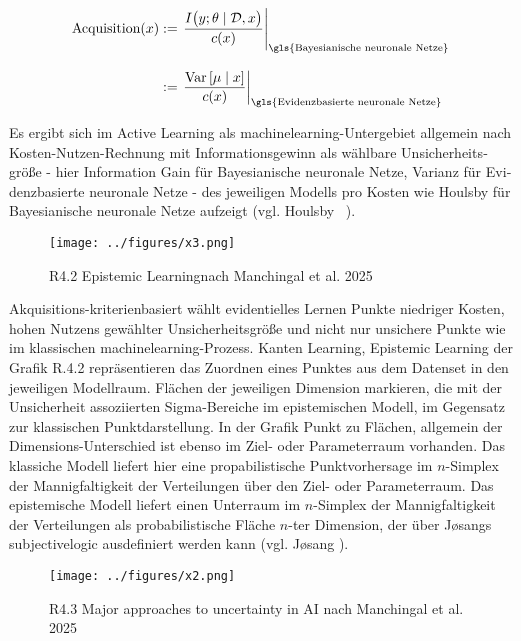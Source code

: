 \begin{otherlanguage}{ngerman}
\begin{align*}
\text{Acquisition}(x)
&:=
\left.
\frac{
I\bigl(y ; \theta \mid \mathcal{D}, x \bigr)
}{
c(x)
}
\right|_{\text{\gls{Bayesianische neuronale Netze}}}
\\[2ex]
&:=
\left.
\frac{
\mathrm{Var}\left[ \mu \mid x \right]
}{
c(x)
}
\right|_{\text{\gls{Evidenzbasierte neuronale Netze}}}
\end{align*}

Es ergibt sich im Active Learning als \gls{machinelearning}-Untergebiet allgemein nach Kosten-Nutzen-Rechnung mit Informationsgewinn als wählbare Unsicherheitsgröße - hier Information Gain für \gls{Bayesianische neuronale Netze}, Varianz für \gls{Evidenzbasierte neuronale Netze} - des jeweiligen Modells pro Kosten wie Houlsby für \gls{Bayesianische neuronale Netze} aufzeigt (vgl. Houlsby ~\parencite[S.9 \glqq{}Bayesian active learning by disagreement (BALD)\grqq{}]{houlsby2011bayesian}). 

\begin{figure}[!ht]
  \centering
  \texttt{[image: ../figures/x3.png]}
  \caption{R4.2 \glqq Epistemic Learning\grqq nach Manchingal et al. 2025}
\end{figure}

Akquisitions-kriterienbasiert wählt evidentielles Lernen Punkte niedriger Kosten, hohen Nutzens gewählter Unsicherheitsgröße und nicht nur unsichere Punkte wie im klassischen \gls{machinelearning}-Prozess. Kanten \glqq{}Learning\grqq{}, \glqq{}Epistemic Learning\grqq{} der Grafik R.4.2 repräsentieren das Zuordnen eines Punktes aus dem Datenset in den jeweiligen Modellraum. Flächen der jeweiligen Dimension markieren, die mit der Unsicherheit assoziierten Sigma-Bereiche im epistemischen Modell, im Gegensatz zur klassischen Punktdarstellung. In der Grafik Punkt zu Flächen, allgemein der Dimensions-Unterschied ist ebenso im Ziel- oder Parameterraum vorhanden. Das klassiche Modell liefert hier eine propabilistische Punktvorhersage im $n$-Simplex der Mannigfaltigkeit der Verteilungen über den Ziel- oder Parameterraum. Das epistemische Modell liefert einen Unterraum im $n$-Simplex der Mannigfaltigkeit der Verteilungen als probabilistische Fläche $n$-ter Dimension, der über Jøsangs \gls{subjectivelogic} ausdefiniert werden kann (vgl. Jøsang \parencite{subjectivelogic}).

\begin{figure}[!ht]
  \centering
  \texttt{[image: ../figures/x2.png]}
  \caption{R4.3 \glqq{}Major approaches to uncertainty in AI\grqq{} nach Manchingal et al. 2025}
\end{figure}


\end{otherlanguage}
